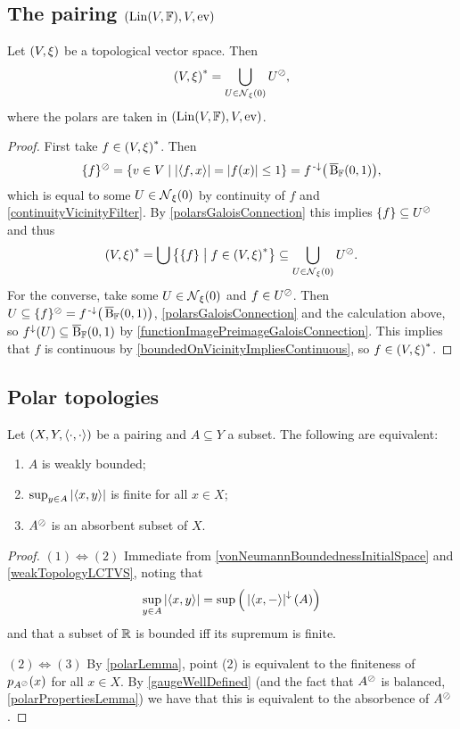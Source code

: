 \subsection{The pairing $\sSet{\Lin(V,\F), V, \evalMap}$}
\begin{proposition} \label{dualFromPolars}
Let $\sSet{V,\xi}$ be a topological vector space. Then
\[ \dual{\sSet{V, \xi}} = \bigcup_{U\in \neighbourhood_\xi(0)}U^\pol, \]
where the polars are taken in $\sSet{\Lin(V, \F), V, \evalMap}$.
\end{proposition}
\begin{proof}
First take $f\in \dual{\sSet{V, \xi}}$. Then
\[ \{f\}^\pol = \setbuilder{v\in V}{\abspair{f,x} = |f(x)| \leq 1} = f^\preimf\big(\cball_\F(0,1)\big), \]
which is equal to some $U\in \operatorname{\mathcal{N}}_\xi(0)$ by continuity of $f$ and \ref{continuityVicinityFilter}. By \ref{polarsGaloisConnection} this implies $\{f\} \subseteq U^\oslash$ and thus
\[ \dual{\sSet{V, \xi}} = \bigcup \setbuilder[\big]{\{f\}}{f\in \dual{\sSet{V, \xi}}} \subseteq \bigcup_{U\in \neighbourhood_\xi(0)}U^\pol. \]
For the converse, take some $U\in \operatorname{\mathcal{N}}_\xi(0)$ and $f\in U^\oslash$. Then $U\subseteq \{f\}^\oslash = f^{\text{\hspace{0.15em}-}\downarrow}\big(\operatorname{\overline{B}}_{\mathbb{F}}(0,1)\big)$, \ref{polarsGaloisConnection} and the calculation above, so $f^\downarrow(U) \subseteq \operatorname{\overline{B}}_{\mathbb{F}}(0,1)$ by \ref{functionImagePreimageGaloisConnection}. This implies that $f$ is continuous by \ref{boundedOnVicinityImpliesContinuous}, so $f\in \dual{\sSet{V, \xi}}$.
\end{proof}

\subsection{Polar topologies}

\begin{lemma} \label{weaklyBoundedLemma}
Let $\sSet{X,Y,\pair{\cdot,\cdot}}$ be a pairing and $A\subseteq Y$ a subset. The following are equivalent:
\begin{enumerate}
\item $A$ is weakly bounded;
\item $\sup_{y\in A}\left|\left\langle x, y \right\rangle\right|$ is finite for all $x\in X$;
\item $A^\oslash$ is an absorbent subset of $X$.
\end{enumerate}
\end{lemma}
\begin{proof}
$(1) \Leftrightarrow (2)$ Immediate from \ref{vonNeumannBoundednessInitialSpace} and \ref{weakTopologyLCTVS}, noting that
\[ \sup_{y\in A}\left|\left\langle x, y \right\rangle\right| = \sup\Big(\left|\left\langle x,- \right\rangle\right|^{\downarrow}(A)\Big) \]
and that a subset of $\mathbb{R}$ is bounded iff its supremum is finite.

$(2) \Leftrightarrow (3)$ By \ref{polarLemma}, point (2) is equivalent to the finiteness of $p_{A^\oslash}(x)$ for all $x\in X$. By \ref{gaugeWellDefined} (and the fact that $A^\oslash$ is balanced, \ref{polarPropertiesLemma}) we have that this is equivalent to the absorbence of $A^\oslash$.
\end{proof}

